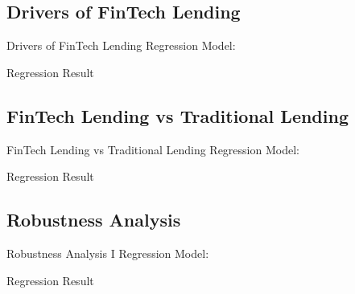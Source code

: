 \documentclass[11pt]{beamer}
\begin{document}
\subsection{Drivers of FinTech Lending}

\begin{frame}{Drivers of FinTech Lending}
    Regression Model:
    \begin{small}
        
    \end{small}
\end{frame}


\begin{frame}{Regression Result}
    \centering
\end{frame}


\subsection{FinTech Lending vs Traditional Lending}

\begin{frame}{FinTech Lending vs Traditional Lending}
    Regression Model:
    \begin{tiny}
        
    \end{tiny}
\end{frame}


\begin{frame}{Regression Result}
    \centering
\end{frame}


\subsection{Robustness Analysis}

\begin{frame}{Robustness Analysis I}
    Regression Model:
    \begin{scriptsize}
        
    \end{scriptsize}
\end{frame}


\begin{frame}{Regression Result}
    \centering
\end{frame}
\end{document}
